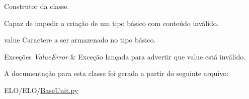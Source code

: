 Construtor da classe. 

Capaz de impedir a criação de um tipo básico com conteúdo inválido.

\begin{DoxyItemize}
\item value Caractere a ser armazenado no tipo básico.\end{DoxyItemize}

\begin{DoxyExceptions}{Exceções}
{\em Value\-Error} & Exceção lançada para advertir que value está inválido. \\
\hline
\end{DoxyExceptions}


A documentação para esta classe foi gerada a partir do seguinte arquivo\-:\begin{DoxyCompactItemize}
\item 
E\-L\-O/\-E\-L\-O/\hyperlink{BaseUnit_8py}{Base\-Unit.\-py}\end{DoxyCompactItemize}
